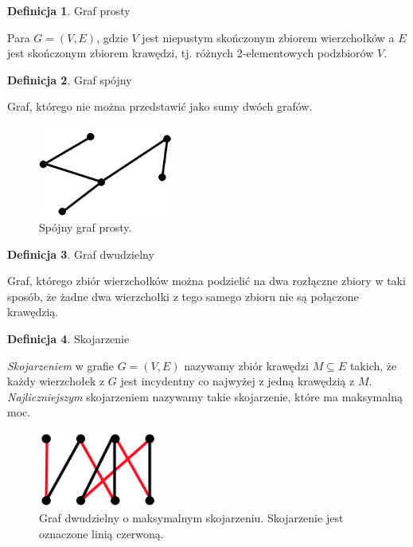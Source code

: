 \documentclass[brudnopis]{xmgr}
\theoremstyle{definition}
\newtheorem{Definicja}{Definicja}
\begin{document}
\begin{Definicja}{Graf prosty}

  Para $G = (V,E)$, gdzie $V$ jest niepustym skończonym zbiorem wierzchołków a $E$ jest skończonym zbiorem krawędzi, tj. różnych 2-elementowych podzbiorów $V$.
\end{Definicja}

\begin{Definicja}{Graf spójny}

  Graf, którego nie można przedstawić jako sumy dwóch grafów.
\end{Definicja}

\begin{figure}[ht!]
  \centering
  \includegraphics[height=3cm]{rysunki/spojny_graf_prosty.png}
    \caption{Spójny graf prosty.}
\end{figure} 

\begin{Definicja}{Graf dwudzielny}

	Graf, którego zbiór wierzchołków można podzielić na dwa rozłączne zbiory w taki sposób, że żadne dwa wierzchołki z tego samego zbioru nie są połączone krawędzią.
\end{Definicja}

\begin{Definicja}{Skojarzenie}

  \emph{Skojarzeniem} w grafie $G=(V,E)$ nazywamy zbiór krawędzi $M \subseteq E$ takich, że każdy wierzchołek z $G$ jest incydentny co najwyżej z jedną krawędzią z $M$. \emph{Najliczniejszym} skojarzeniem nazywamy takie skojarzenie, które ma maksymalną moc.   
\end{Definicja}

\begin{figure}[ht!]
  \centering
  \includegraphics[height=2.5cm]{rysunki/graf_dwudzielny_skojarzenie.png}
    \caption{Graf dwudzielny o maksymalnym skojarzeniu. Skojarzenie jest oznaczone linią czerwoną.}
\end{figure} 
\end{document}
